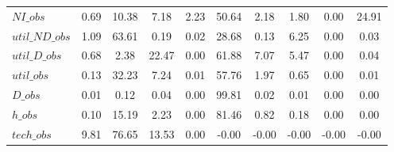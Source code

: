 \begin{center}
\begin{longtable}{lccccccccc}
$NI\_obs        $	 & 	         0.69	 & 	        10.38	 & 	         7.18	 & 	         2.23	 & 	        50.64	 & 	         2.18	 & 	         1.80	 & 	         0.00	 & 	        24.91 \\ 
$util\_ND\_obs  $	 & 	         1.09	 & 	        63.61	 & 	         0.19	 & 	         0.02	 & 	        28.68	 & 	         0.13	 & 	         6.25	 & 	         0.00	 & 	         0.03 \\ 
$util\_D\_obs   $	 & 	         0.68	 & 	         2.38	 & 	        22.47	 & 	         0.00	 & 	        61.88	 & 	         7.07	 & 	         5.47	 & 	         0.00	 & 	         0.04 \\ 
$util\_obs      $	 & 	         0.13	 & 	        32.23	 & 	         7.24	 & 	         0.01	 & 	        57.76	 & 	         1.97	 & 	         0.65	 & 	         0.00	 & 	         0.01 \\ 
$D\_obs         $	 & 	         0.01	 & 	         0.12	 & 	         0.04	 & 	         0.00	 & 	        99.81	 & 	         0.02	 & 	         0.01	 & 	         0.00	 & 	         0.00 \\ 
$h\_obs         $	 & 	         0.10	 & 	        15.19	 & 	         2.23	 & 	         0.00	 & 	        81.46	 & 	         0.82	 & 	         0.18	 & 	         0.00	 & 	         0.00 \\ 
$tech\_obs      $	 & 	         9.81	 & 	        76.65	 & 	        13.53	 & 	         0.00	 & 	        -0.00	 & 	        -0.00	 & 	        -0.00	 & 	        -0.00	 & 	        -0.00 \\ 
\end{longtable}
 \end{center}
